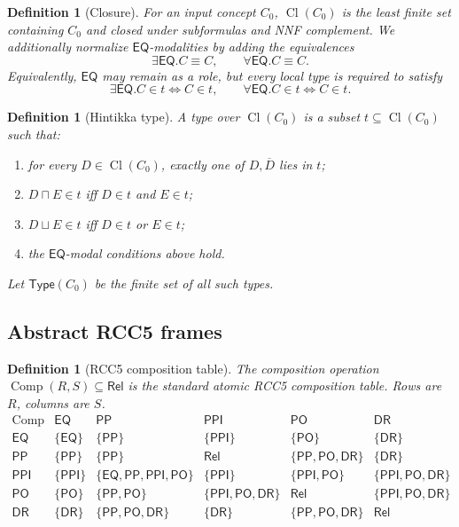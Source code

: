 \documentclass[11pt]{article}
\newtheorem{definition}[theorem]{Definition}
\newcommand{\Rel}{\mathsf{Rel}}
\newcommand{\EQ}{\mathsf{EQ}}
\newcommand{\PP}{\mathsf{PP}}
\newcommand{\PPI}{\mathsf{PPI}}
\newcommand{\PO}{\mathsf{PO}}
\newcommand{\DR}{\mathsf{DR}}
\newcommand{\Cl}{\operatorname{Cl}}
\newcommand{\Comp}{\operatorname{Comp}}
\begin{document}
\begin{definition}[Closure]
For an input concept $C_0$, $\Cl(C_0)$ is the least finite set containing $C_0$ and closed under subformulas and NNF complement.  We additionally normalize $\EQ$-modalities by adding the equivalences
\[
  \exists\EQ.C \equiv C,
  \qquad
  \forall\EQ.C \equiv C.
\]
Equivalently, $\EQ$ may remain as a role, but every local type is required to satisfy
\[
  \exists\EQ.C\in t \Leftrightarrow C\in t,
  \qquad
  \forall\EQ.C\in t \Leftrightarrow C\in t.
\]
\end{definition}

\begin{definition}[Hintikka type]
A type over $\Cl(C_0)$ is a subset $t\subseteq\Cl(C_0)$ such that:
\begin{enumerate}[label=(T\arabic*)]
\item for every $D\in\Cl(C_0)$, exactly one of $D,\overline D$ lies in $t$;
\item $D\sqcap E\in t$ iff $D\in t$ and $E\in t$;
\item $D\sqcup E\in t$ iff $D\in t$ or $E\in t$;
\item the $\EQ$-modal conditions above hold.
\end{enumerate}
Let $\mathsf{Type}(C_0)$ be the finite set of all such types.
\end{definition}

\subsection{Abstract RCC5 frames}

\begin{definition}[RCC5 composition table]
The composition operation $\Comp(R,S)\subseteq\Rel$ is the standard atomic RCC5 composition table.  Rows are $R$, columns are $S$.
\[
\begin{array}{c|ccccc}
\Comp & \EQ & \PP & \PPI & \PO & \DR\\
\hline
\EQ  & \{\EQ\} & \{\PP\} & \{\PPI\} & \{\PO\} & \{\DR\}\\
\PP  & \{\PP\} & \{\PP\} & \Rel & \{\PP,\PO,\DR\} & \{\DR\}\\
\PPI & \{\PPI\} & \{\EQ,\PP,\PPI,\PO\} & \{\PPI\} & \{\PPI,\PO\} & \{\PPI,\PO,\DR\}\\
\PO  & \{\PO\} & \{\PP,\PO\} & \{\PPI,\PO,\DR\} & \Rel & \{\PPI,\PO,\DR\}\\
\DR  & \{\DR\} & \{\PP,\PO,\DR\} & \{\DR\} & \{\PP,\PO,\DR\} & \Rel
\end{array}
\]
\end{definition}
\end{document}
